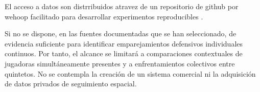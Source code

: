 El acceso a datos son distrribuidos atravez de un repositorio de github por wehoop facilitado para desarrollar experimentos reproducibles \cite{wehoopRepositorio}.

Si no se dispone, en las fuentes documentadas que se han seleccionado, de evidencia suficiente para identificar emparejamientos defensivos individuales continuos. Por tanto, el alcance se limitará a comparaciones contextuales de jugadoras simultáneamente presentes y a enfrentamientos colectivos entre quintetos. No se contempla la creación de un sistema comercial ni la adquisición de datos privados de seguimiento espacial.